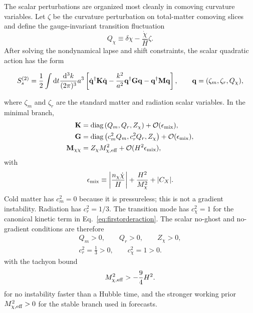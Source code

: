 \documentclass[aps,prd,reprint,nofootinbib,superscriptaddress,longbibliography]{revtex4-2}
\newcommand{\dd}{\mathrm{d}}
\begin{document}
The scalar perturbations are organized most cleanly in comoving curvature variables.  Let $\zeta$ be the curvature perturbation on total-matter comoving slices and define the gauge-invariant transition fluctuation
\begin{equation}
  Q_\chi\equiv\delta\chi-\frac{\dot\chi}{H}\zeta .
  \label{eq:Qchi_def}
\end{equation}
After solving the nondynamical lapse and shift constraints, the scalar quadratic action has the form
\begin{widetext}
\begin{equation}
  S_s^{(2)}=\frac12\int\dd t\frac{\dd^3k}{(2\pi)^3}a^3
  \left[
  \dot{\mathbf q}^{\dagger}{\bf K}\dot{\mathbf q}
  -\frac{k^2}{a^2}\mathbf q^{\dagger}{\bf G}\mathbf q
  -\mathbf q^{\dagger}{\bf M}\mathbf q
  \right],
  \qquad
  \mathbf q=(\zeta_m,\zeta_r,Q_\chi),
  \label{eq:scalar_quadratic_matrix}
\end{equation}
\end{widetext}
where $\zeta_m$ and $\zeta_r$ are the standard matter and radiation scalar variables.  In the minimal branch,
\begin{align}
  {\bf K}&={\rm diag}\left(Q_m,Q_r,Z_\chi\right)+\mathcal O(\epsilon_{\rm mix}),\label{eq:Kmatrix}\\
  {\bf G}&={\rm diag}\left(c_m^2Q_m,c_r^2Q_r,Z_\chi\right)+\mathcal O(\epsilon_{\rm mix}),\label{eq:Gmatrix}\\
  {\bf M}_{\chi\chi}&=Z_\chi M_{\chi,\rm eff}^2+\mathcal O(H^2\epsilon_{\rm mix}),\label{eq:Mmatrix}
\end{align}
with
\begin{equation}
  \epsilon_{\rm mix}\equiv
  \left|\frac{n_\chi\dot\chi}{H}\right|+
  \frac{H^2}{M_\chi^2}+|C_X| .
  \label{eq:epsmix}
\end{equation}
Cold matter has $c_m^2=0$ because it is pressureless; this is not a gradient instability.  Radiation has $c_r^2=1/3$.  The transition mode has $c_\chi^2=1$ for the canonical kinetic term in Eq.~\eqref{eq:firstorderaction}.  The scalar no-ghost and no-gradient conditions are therefore
\begin{align}
  Q_m>0,
  \qquad Q_r>0,
  \qquad Z_\chi>0,\label{eq:scalar_stability_conditions}\\
  c_r^2=\frac13>0,
  \qquad c_\chi^2=1>0 .\nonumber
\end{align}
with the tachyon bound
\begin{equation}
  M_{\chi,\rm eff}^2>-\frac94H^2 .
  \label{eq:tachyon_bound}
\end{equation}
for no instability faster than a Hubble time, and the stronger working prior $M_{\chi,\rm eff}^2>0$ for the stable branch used in forecasts.
\end{document}
